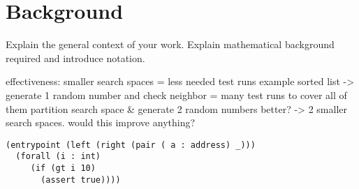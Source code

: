 \chapter{Background}\label{chap:background}
Explain the general context of your work.
Explain mathematical background required and introduce notation.




effectiveness:
smaller search spaces = less needed test runs
example sorted list -> generate 1 random number and check neighbor = many test runs to cover all of them
partition search space \& generate 2 random numbers better? -> 2 smaller search spaces. would this improve anything?



\begin{lstlisting}[numbers=none, language=Assertion]
(entrypoint (left (right (pair ( a : address) _)))
  (forall (i : int)
     (if (gt i 10)
       (assert true))))
\end{lstlisting}